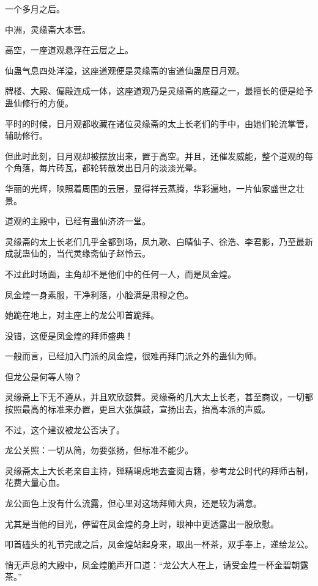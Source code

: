 
\begin{this_body}

一个多月之后。

中洲，灵缘斋大本营。

高空，一座道观悬浮在云层之上。

仙蛊气息四处洋溢，这座道观便是灵缘斋的宙道仙蛊屋日月观。

牌楼、大殿、偏殿连成一体，这座道观乃是灵缘斋的底蕴之一，最擅长的便是给予蛊仙修行的方便。

平时的时候，日月观都收藏在诸位灵缘斋的太上长老们的手中，由她们轮流掌管，辅助修行。

但此时此刻，日月观却被摆放出来，置于高空。并且，还催发威能，整个道观的每个角落，每片砖瓦，都轮转散发出日月的淡淡光晕。

华丽的光辉，映照着周围的云层，显得祥云蒸腾，华彩遍地，一片仙家盛世之壮景。

道观的主殿中，已经有蛊仙济济一堂。

灵缘斋的太上长老们几乎全都到场，凤九歌、白晴仙子、徐浩、李君影，乃至最新成就蛊仙的，当代灵缘斋仙子赵怜云。

不过此时场面，主角却不是他们中的任何一人，而是凤金煌。

凤金煌一身素服，干净利落，小脸满是肃穆之色。

她跪在地上，对主座上的龙公叩首跪拜。

没错，这便是凤金煌的拜师盛典！

一般而言，已经加入门派的凤金煌，很难再拜门派之外的蛊仙为师。

但龙公是何等人物？

灵缘斋上下无不遵从，并且欢欣鼓舞。灵缘斋的几大太上长老，甚至商议，一切都按照最高的标准来办置，更且大张旗鼓，宣扬出去，抬高本派的声威。

不过，这个建议被龙公否决了。

龙公关照：一切从简，勿要张扬，但标准不能少。

灵缘斋太上大长老亲自主持，殚精竭虑地去查阅古籍，参考龙公时代的拜师古制，花费大量心血。

龙公面色上没有什么流露，但心里对这场拜师大典，还是较为满意。

尤其是当他的目光，停留在凤金煌的身上时，眼神中更透露出一股欣慰。

叩首磕头的礼节完成之后，凤金煌站起身来，取出一杯茶，双手奉上，递给龙公。

悄无声息的大殿中，凤金煌脆声开口道：“龙公大人在上，请受金煌一杯金碧朝露茶。”


\end{this_body}
